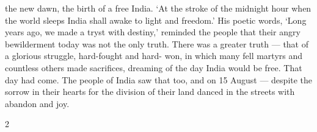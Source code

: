 \begin{multicols}{2}
the new dawn, the birth of a free India. `At the stroke of the midnight hour when the world sleeps India shall awake to light and freedom.' His poetic words, `Long years ago, we made a tryst with destiny,' reminded the people that their angry bewilderment today was not the only truth. There was a greater truth --- that of a glorious struggle, hard-fought and hard- won, in which many fell martyrs and countless others made sacrifices, dreaming of the day India would be free. That day had come. The people of India saw that too, and on 15 August --- despite the sorrow in their hearts for the division of their land danced in the streets with abandon and joy.
\end{multicols}{2}
